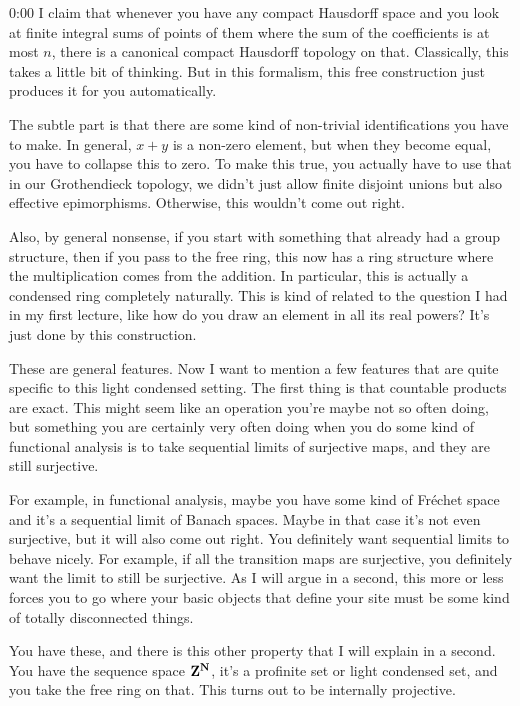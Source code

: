 \begin{unfinished}{0:00}
I claim that whenever you have any compact Hausdorff space and you look at finite integral sums of points of them where the sum of the coefficients is at most $n$, there is a canonical compact Hausdorff topology on that. Classically, this takes a little bit of thinking. But in this formalism, this free construction just produces it for you automatically.

The subtle part is that there are some kind of non-trivial identifications you have to make. In general, $x+y$ is a non-zero element, but when they become equal, you have to collapse this to zero. To make this true, you actually have to use that in our Grothendieck topology, we didn't just allow finite disjoint unions but also effective epimorphisms. Otherwise, this wouldn't come out right.

Also, by general nonsense, if you start with something that already had a group structure, then if you pass to the free ring, this now has a ring structure where the multiplication comes from the addition. In particular, this is actually a condensed ring completely naturally. This is kind of related to the question I had in my first lecture, like how do you draw an element in all its real powers? It's just done by this construction.

These are general features. Now I want to mention a few features that are quite specific to this light condensed setting. The first thing is that countable products are exact. This might seem like an operation you're maybe not so often doing, but something you are certainly very often doing when you do some kind of functional analysis is to take sequential limits of surjective maps, and they are still surjective.

For example, in functional analysis, maybe you have some kind of Fréchet space and it's a sequential limit of Banach spaces. Maybe in that case it's not even surjective, but it will also come out right. You definitely want sequential limits to behave nicely. For example, if all the transition maps are surjective, you definitely want the limit to still be surjective. As I will argue in a second, this more or less forces you to go where your basic objects that define your site must be some kind of totally disconnected things.

You have these, and there is this other property that I will explain in a second. You have the sequence space $\mathbf Z^\mathbf N$, it's a profinite set or light condensed set, and you take the free ring on that. This turns out to be internally projective.


\end{unfinished}
